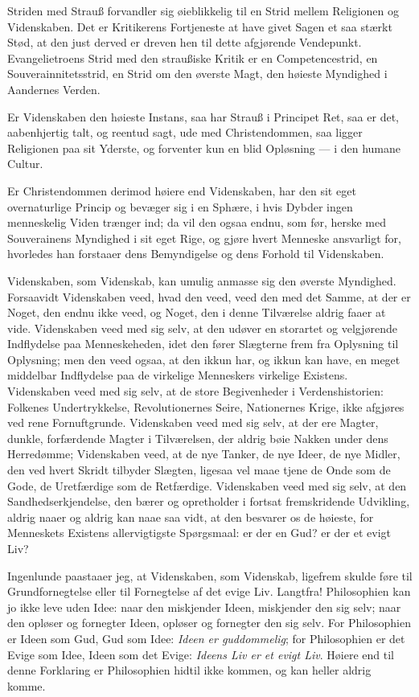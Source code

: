 \documentclass[12pt,a4paper]{book}
\newcommand{\opage}[1]{\marginnote{\footnotesize\textit{[#1]}}}
\begin{document}
Striden med Strauß forvandler sig øieblikkelig til en Strid mellem
Religionen og Videnskaben. Det er Kritikerens Fortjeneste at have givet
Sagen et saa stærkt Stød, at den just derved er dreven hen til dette
afgjørende Vendepunkt. Evangelietroens Strid med den straußiske Kritik
er en Competencestrid, en Souverainnitetsstrid, en Strid om den øverste
Magt, den høieste Myndighed i Aandernes Verden.

Er Videnskaben den høieste Instans, saa har Strauß i Principet Ret, saa
er det, aabenhjertig talt, og reentud sagt, ude med
\opage{86} Christendommen, saa ligger Religionen paa sit Yderste, og forventer kun
en blid Opløsning --- i den humane Cultur.

Er Christendommen derimod høiere end Videnskaben, har den sit eget
overnaturlige Princip og bevæger sig i en Sphære, i hvis Dybder ingen
menneskelig Viden trænger ind; da vil den ogsaa endnu, som før, herske
med Souverainens Myndighed i sit eget Rige, og gjøre hvert Menneske
ansvarligt for, hvorledes han forstaaer dens Bemyndigelse og dens Forhold
til Videnskaben.

Videnskaben, som Videnskab, kan umulig anmasse sig den øverste
Myndighed. Forsaavidt Videnskaben veed, hvad den veed, veed den med det
Samme, at der er Noget, den endnu ikke veed, og Noget, den i denne
Tilværelse aldrig faaer at vide. Videnskaben veed med sig selv, at den
udøver en storartet og velgjørende Indflydelse paa Menneskeheden, idet
den fører Slægterne frem fra Oplysning til Oplysning; men den veed ogsaa,
at den ikkun har, og ikkun kan have, en meget middelbar Indflydelse paa
de virkelige Menneskers virkelige Existens. Videnskaben veed med sig
selv, at de store Begivenheder i Verdenshistorien: Folkenes
Undertrykkelse, Revolutionernes Seire, Nationernes Krige, ikke afgjøres
ved rene Fornuftgrunde. Videnskaben veed med sig selv, at der ere
Magter, dunkle, forfærdende Magter i Tilværelsen, der aldrig bøie Nakken
under dens Herredømme; Videnskaben veed, at de nye Tanker, de nye Ideer,
de nye Midler, den ved hvert Skridt tilbyder Slægten, ligesaa vel maae
tjene de Onde som de Gode, de Uretfærdige som de Retfærdige. Videnskaben
veed med sig selv, at den Sandhedserkjendelse, den bærer og opretholder i
fortsat fremskridende Udvikling, aldrig naaer og aldrig kan naae saa
vidt, at den besvarer os de høieste, for Menneskets Existens
allervigtigste Spørgsmaal: er der en Gud? er der et evigt Liv?

Ingenlunde paastaaer jeg, at Videnskaben, som Videnskab, ligefrem skulde
føre til Grundfornegtelse eller til Fornegtelse af
\opage{87} det evige Liv. Langtfra! Philosophien kan jo ikke leve uden Idee: naar
den miskjender Ideen, miskjender den sig selv; naar den opløser og
fornegter Ideen, opløser og fornegter den sig selv. For Philosophien er
Ideen som Gud, Gud som Idee: \emph{Ideen er guddommelig}; for
Philosophien er det Evige som Idee, Ideen som det Evige: \emph{Ideens Liv
er et evigt Liv}. Høiere end til denne Forklaring er Philosophien hidtil
ikke kommen, og kan heller aldrig komme.
\end{document}
